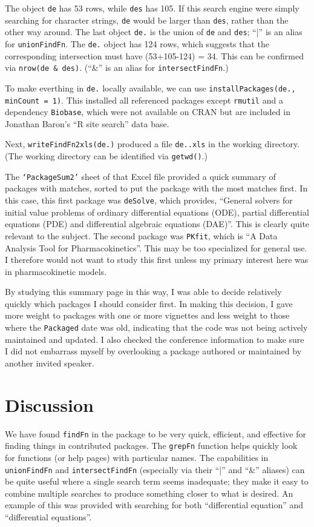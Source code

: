 The object {\tt de} has 53 rows, while {\tt des} has 105.
If this search engine were simply searching for character
strings, {\tt de} would be larger than {\tt des}, rather than
the other way around.  The last object {\tt de.} is the union
of {\tt de} and {\tt des};  ``|'' is an alias for {\tt unionFindFn}.
The {\tt de.} object has 124 rows, which suggests that
the corresponding intersection must have (53+105-124) = 34.
This can be confirmed via {\tt nrow(de \& des)}.
(``\&'' is an alias for {\tt intersectFindFn}.)

To make everthing in {\tt de.} locally available, we can use
{\tt installPackages(de., minCount = 1)}.  This installed all
referenced packages except {\tt rmutil} and a dependency {\tt Biobase},
which were not available on CRAN but are included in Jonathan
Baron's ``R site search'' data base.

Next, {\tt writeFindFn2xls(de.)} produced a file {\tt de..xls}
in the working directory.  (The working directory can be
identified via {\tt getwd()}.)

The {\tt `PackageSum2'} sheet of that Excel file provided a quick
summary of packages with matches, sorted to put the package
with the most matches first.  In this case, this first package
was {\tt deSolve}, which provides, ``General solvers for initial
value problems of ordinary differential equations (ODE),
partial differential equations (PDE) and differential
algebraic equations (DAE)''.  This is clearly quite relevant
to the subject.  The second package was {\tt PKfit}, which
is ``A Data Analysis Tool for Pharmacokinetics''.  This may
be too specialized for general use.  I therefore would not
want to study this first unless my primary interest here was in
pharmacokinetic models.

By studying this summary page in this way, I was able to decide
relatively quickly which packages I should consider first.  In
making this decision, I gave more weight to packages with
one or more vignettes and less weight to those where the
{\tt Packaged} date was old, indicating that the code was not being
actively maintained and updated.  I also checked the conference
information to make sure I did not embarrass myself by overlooking
a package authored or maintained by another invited speaker.

\section{Discussion}
We have found {\tt findFn} in the  package to
be very quick, efficient, and effective for finding things in
contributed packages.  The {\tt grepFn} function helps quickly
look for functions (or help pages) with particular names.
The capabilities in {\tt unionFindFn} and {\tt intersectFindFn}
(especially via their ``|'' and ``\&'' aliases) can be quite useful
where a single search term seems inadequate;  they make it easy
to combine multiple searches to produce something closer to what
is desired.  An example of this was provided with searching for
both ``differential equation'' and ``differential equations''.

